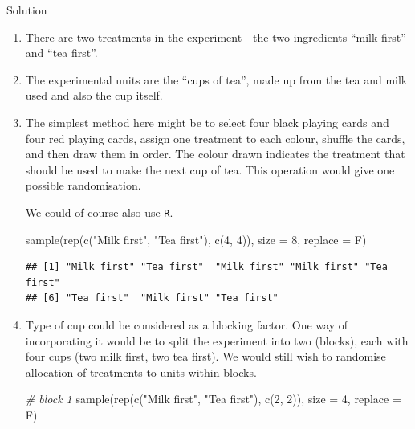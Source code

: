\documentclass[
]{book}
\newenvironment{Shaded}{\begin{snugshade}}{\end{snugshade}}
\newcommand{\AttributeTok}[1]{\textcolor[rgb]{0.77,0.63,0.00}{#1}}
\newcommand{\CommentTok}[1]{\textcolor[rgb]{0.56,0.35,0.01}{\textit{#1}}}
\newcommand{\DecValTok}[1]{\textcolor[rgb]{0.00,0.00,0.81}{#1}}
\newcommand{\FunctionTok}[1]{\textcolor[rgb]{0.00,0.00,0.00}{#1}}
\newcommand{\NormalTok}[1]{#1}
\newcommand{\StringTok}[1]{\textcolor[rgb]{0.31,0.60,0.02}{#1}}
\theoremstyle{definition}
\theoremstyle{definition}
\theoremstyle{definition}
\theoremstyle{definition}
\theoremstyle{remark}
\begin{document}
Solution

\begin{enumerate}
\def\labelenumi{\alph{enumi}.}
\item
  There are two treatments in the experiment - the two ingredients ``milk first'' and ``tea first''.
\item
  The experimental units are the ``cups of tea'', made up from the tea and milk used and also the cup itself.
\item
  The simplest method here might be to select four black playing cards and four red playing cards, assign one treatment to each colour, shuffle the cards, and then draw them in order. The colour drawn indicates the treatment that should be used to make the next cup of tea. This operation would give one possible randomisation.

  We could of course also use \texttt{R}.

\begin{Shaded}
\begin{Highlighting}[]
\FunctionTok{sample}\NormalTok{(}\FunctionTok{rep}\NormalTok{(}\FunctionTok{c}\NormalTok{(}\StringTok{"Milk first"}\NormalTok{, }\StringTok{"Tea first"}\NormalTok{), }\FunctionTok{c}\NormalTok{(}\DecValTok{4}\NormalTok{, }\DecValTok{4}\NormalTok{)), }\AttributeTok{size =} \DecValTok{8}\NormalTok{, }\AttributeTok{replace =}\NormalTok{ F)}
\end{Highlighting}
\end{Shaded}

\begin{verbatim}
## [1] "Milk first" "Tea first"  "Milk first" "Milk first" "Tea first" 
## [6] "Tea first"  "Milk first" "Tea first"
\end{verbatim}
\item
  Type of cup could be considered as a blocking factor. One way of incorporating it would be to split the experiment into two (blocks), each with four cups (two milk first, two tea first). We would still wish to randomise allocation of treatments to units within blocks.

\begin{Shaded}
\begin{Highlighting}[]
\CommentTok{\# block 1}
\FunctionTok{sample}\NormalTok{(}\FunctionTok{rep}\NormalTok{(}\FunctionTok{c}\NormalTok{(}\StringTok{"Milk first"}\NormalTok{, }\StringTok{"Tea first"}\NormalTok{), }\FunctionTok{c}\NormalTok{(}\DecValTok{2}\NormalTok{, }\DecValTok{2}\NormalTok{)), }\AttributeTok{size =} \DecValTok{4}\NormalTok{, }\AttributeTok{replace =}\NormalTok{ F)}
\end{Highlighting}
\end{Shaded}


\end{enumerate}
\end{document}
